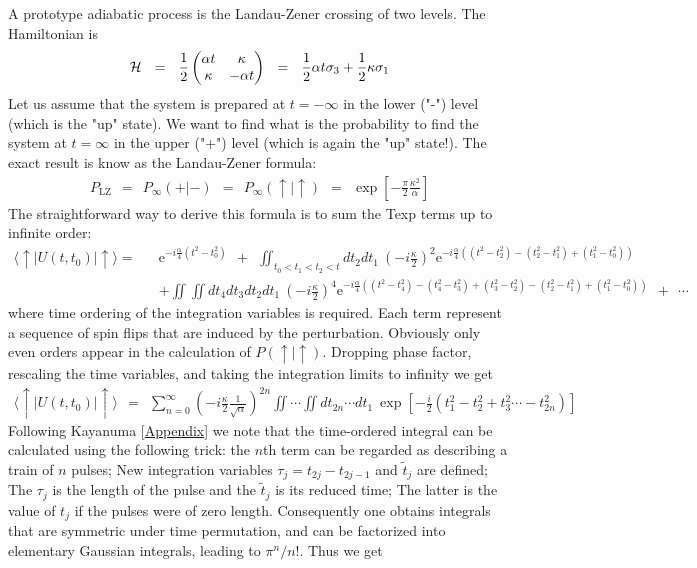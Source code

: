 \documentclass[onecolumn,fleqn, 11pt]{revtex4}
\newcommand{\eexp}{\mathrm{e}^}
\newcommand{\tbox}[1]{\text{#1}}
\newcommand{\amatrix}[1]{\begin{matrix} #1 \end{matrix}}
\newcommand{\beq}{\begin{eqnarray}}
\newcommand{\eeq}{\end{eqnarray}}
\begin{document}
A prototype adiabatic process is the 
Landau-Zener crossing of two levels. 
The Hamiltonian is 
\beq
\mathcal{H}
\ \ = \ \ 
\frac{1}{2}\left(\amatrix{\alpha t & \kappa \cr \kappa & -\alpha t}\right)
\ \ = \ \ 
\frac{1}{2}\alpha t \sigma_3 + \frac{1}{2}\kappa \sigma_1 
\eeq
Let us assume that the system is prepared at ${t=-\infty}$
in the lower ("-") level (which is the "up" state). 
We want to find what is the probability to find 
the system at ${t=\infty}$ in the upper ("+") level 
(which is again the "up" state!). The exact result is 
know as the Landau-Zener formula:
\beq 
P_{\tbox{LZ}} \ \ = \ \ P_{\infty}(+|-)  \ \ = \ \ P_{\infty}(\uparrow|\uparrow)
\ \ = \ \ \exp\left[-\frac{\pi}{2}\frac{\kappa^2}{\alpha} \right]
\eeq
The straightforward way to derive this formula is to 
sum the Texp terms up to infinite order:
\beq \nonumber
\langle \uparrow | U(t,t_0) | \uparrow \rangle = \!\! &&  
\eexp{-i\frac{\alpha}{4} (t^2-t_0^2)} 
\ \ + \ \ \iint_{t_0<t_1<t_2<t} dt_2dt_1 \ \left(-i\frac{\kappa}{2}\right)^2 \eexp{-i\frac{\alpha}{4} \left((t^2-t_2^2)-(t_2^2-t_1^2)+(t_1^2-t_0^2)\right)}
\\ && +\iint\iint dt_4 dt_3 dt_2 dt_1 \ 
\left(-i\frac{\kappa}{2}\right)^4 \eexp{-i\frac{\alpha}{4}\left( (t^2-t_4^2)-(t_4^2-t_3^2)+(t_3^2-t_2^2)-(t_2^2-t_1^2)+(t_1^2-t_0^2)\right)}
\ \ + \ \ \cdots
\eeq 
where time ordering of the integration variables is required. 
Each term represent a sequence of spin flips that are induced by the perturbation. 
Obviously only even orders appear in the calculation of $P(\uparrow|\uparrow)$. 
Dropping phase factor, rescaling the time variables, and taking 
the integration limits to infinity we get   
\beq 
\langle \uparrow | U(t,t_0) | \uparrow \rangle \ \ = \ \ 
\sum_{n=0}^{\infty}  \left(-i\frac{\kappa}{2}\frac{1}{\sqrt{\alpha}}\right)^{2n} \iint \cdots \iint dt_{2n} \cdots dt_1 \ 
\exp\left[-\frac{i}{2}\left(t_1^2-t_2^2+t_3^2 \cdots -t_{2n}^2 \right)\right]
\eeq
Following Kayanuma [\href{http://journals.jps.jp/doi/abs/10.1143/JPSJ.53.108}{Appendix}]  
we note that the time-ordered integral can be calculated using the 
following trick: the $n$th term can be regarded as describing a train 
of $n$ pulses; New integration variables $\tau_j=t_{2j}-t_{2j-1}$ and $\tilde{t}_j$ are defined;   
The $\tau_j$ is the length of the pulse and the $\tilde{t}_j$  is its reduced time; 
The latter is the value of $t_j$ if the pulses were of zero length.
Consequently one obtains integrals that are symmetric under time permutation, 
and can be factorized into elementary Gaussian integrals, leading to $\pi^n/n!$. 
Thus we get  
\end{document}
